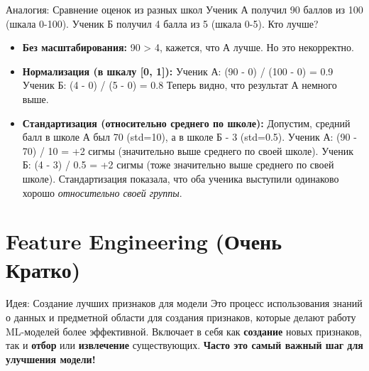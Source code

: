 \begin{myexampleblock}{Аналогия: Сравнение оценок из разных школ}
    Ученик А получил 90 баллов из 100 (шкала 0-100). Ученик Б получил 4 балла из 5 (шкала 0-5). Кто лучше?
    \begin{itemize}
        \item \textbf{Без масштабирования:} 90 > 4, кажется, что А лучше. Но это некорректно.
        \item \textbf{Нормализация (в шкалу [0, 1]):}
            Ученик А: (90 - 0) / (100 - 0) = 0.9
            Ученик Б: (4 - 0) / (5 - 0) = 0.8
            Теперь видно, что результат А немного выше.
        \item \textbf{Стандартизация (относительно среднего по школе):} Допустим, средний балл в школе А был 70 (std=10), а в школе Б - 3 (std=0.5).
            Ученик А: (90 - 70) / 10 = +2 сигмы (значительно выше среднего по своей школе).
            Ученик Б: (4 - 3) / 0.5 = +2 сигмы (тоже значительно выше среднего по своей школе).
            Стандартизация показала, что оба ученика выступили одинаково хорошо \textit{относительно своей группы}.
    \end{itemize}
\end{myexampleblock}

\section{Feature Engineering (Очень Кратко)}

\begin{myblock}{Идея: Создание лучших признаков для модели}
    Это процесс использования знаний о данных и предметной области для создания признаков, которые делают работу ML-моделей более эффективной. Включает в себя как \textbf{создание} новых признаков, так и \textbf{отбор} или \textbf{извлечение} существующих. \textbf{Часто это самый важный шаг для улучшения модели!}
\end{myblock}

